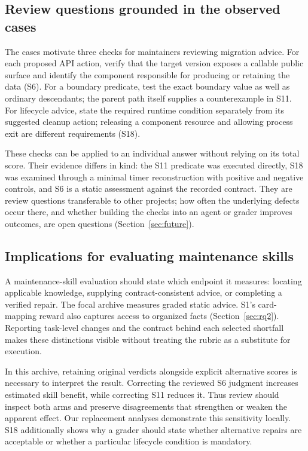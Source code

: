 \documentclass[11pt]{article}
\begin{document}
\subsection{Review questions grounded in the observed cases}\label{sec:review_questions}
The cases motivate three checks for maintainers reviewing migration advice. For each proposed API action, verify that the target version exposes a callable public surface and identify the component responsible for producing or retaining the data (S6). For a boundary predicate, test the exact boundary value as well as ordinary descendants; the parent path itself supplies a counterexample in S11. For lifecycle advice, state the required runtime condition separately from its suggested cleanup action; releasing a component resource and allowing process exit are different requirements (S18).

These checks can be applied to an individual answer without relying on its total score. Their evidence differs in kind: the S11 predicate was executed directly, S18 was examined through a minimal timer reconstruction with positive and negative controls, and S6 is a static assessment against the recorded contract. They are review questions transferable to other projects; how often the underlying defects occur there, and whether building the checks into an agent or grader improves outcomes, are open questions (Section~\ref{sec:future}).

\subsection{Implications for evaluating maintenance skills}
A maintenance-skill evaluation should state which endpoint it measures: locating applicable knowledge, supplying contract-consistent advice, or completing a verified repair. The focal archive measures graded static advice. S1's card-mapping reward also captures access to organized facts (Section~\ref{sec:rq2}). Reporting task-level changes and the contract behind each selected shortfall makes these distinctions visible without treating the rubric as a substitute for execution.

In this archive, retaining original verdicts alongside explicit alternative scores is necessary to interpret the result. Correcting the reviewed S6 judgment increases estimated skill benefit, while correcting S11 reduces it. Thus review should inspect both arms and preserve disagreements that strengthen or weaken the apparent effect. Our replacement analyses demonstrate this sensitivity locally. S18 additionally shows why a grader should state whether alternative repairs are acceptable or whether a particular lifecycle condition is mandatory.
\end{document}
